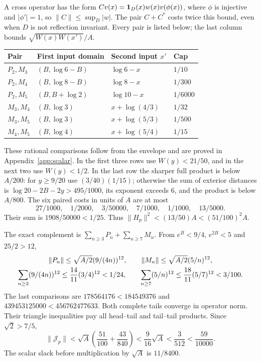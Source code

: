 \documentclass[11pt,a4paper]{article}
\numberwithin{equation}{section}
\theoremstyle{remark}\newtheorem{remark}[theorem]{Remark}
\newcommand{\norm}[1]{\lVert#1\rVert}\newcommand{\abs}[1]{\lvert#1\rvert}
\begin{document}
A cross operator has the form $Cv(x)=\mathbf1_D(x)w(x)v(\phi(x))$,
where $\phi$ is injective and $|\phi'|=1$, so $\norm C\le\sup_D|w|$.
The pair $C+C^*$ costs twice this bound, even when $D$ is not reflection invariant.
Every pair is listed below; the last column bounds $\sqrt{W(x)W(x')}/A$.
\begin{center}\small
\begin{tabular}{@{}llll@{}}\toprule
Pair & First input domain & Second input $x'$ & Cap\\\midrule
$P_2,M_3$ & $(B,\log6-B)$ & $\log6-x$ & $1/10$\\
$P_2,M_4$ & $(B,\log8-B)$ & $\log8-x$ & $1/300$\\
$P_2,M_5$ & $(B,B+\log2)$ & $\log10-x$ & $1/6000$\\
$M_3,M_4$ & $(B,\log3)$ & $x+\log(4/3)$ & $1/32$\\
$M_3,M_5$ & $(B,\log3)$ & $x+\log(5/3)$ & $1/500$\\
$M_4,M_5$ & $(B,\log4)$ & $x+\log(5/4)$ & $1/15$\\\bottomrule
\end{tabular}
\end{center}
These rational comparisons follow from the envelope and are proved in Appendix~\ref{app:scalar}. In the first three rows use $W(y)<21/50$, and in the next two use $W(y)<1/2$.
In the last row the sharper full product is below $A/200$:
for $y\ge9/20$ use $(3/40)(1/15)$; otherwise the sum of exterior distances is
$\log20-2B-2y>495/1000$, its exponent exceeds $6$, and the product is below $A/800$.
The six paired costs in units of $A$ are at most
\[
 27/1000,\quad1/2000,\quad3/50000,\quad7/1000,\quad1/1000,\quad13/5000.
\]
Their sum is $1908/50000<1/25$. Thus $\norm{H_p}^2<(13/50)A<(51/100)^2A$.

The exact complement is $\sum_{n\ge3}P_n+\sum_{n\ge7}M_n$.
From $e^B<9/4$, $e^{2B}<5$ and $25/2>12$,
\begin{gather}
 \norm{P_n}\le\sqrt{A/2}(9/(4n))^{12},\qquad
 \norm{M_n}\le\sqrt{A/2}(5/n)^{12},\notag\\
 \sum_{n\ge3}(9/(4n))^{12}\le\frac{14}{11}(3/4)^{12}<1/24,\qquad
 \sum_{n\ge7}(5/n)^{12}\le\frac{18}{11}(5/7)^{12}<3/100.\label{eq:bothtails}
\end{gather}
The last comparisons are $178564176<184549376$ and
$439453125000<456762477633$. Both complete tails converge in operator norm.
Their triangle inequalities pay all head--tail and tail--tail products.
Since $\sqrt2>7/5$,
\begin{equation}\label{eq:weightedprimenorm}
 \norm{\mathcal J_p}<\sqrt A\left(\frac{51}{100}+\frac{43}{840}\right)
 <\frac9{16}\sqrt A<\frac3{512}<\frac{59}{10000}.
\end{equation}
The scalar slack before multiplication by $\sqrt A$ is $11/8400$.
\end{document}
